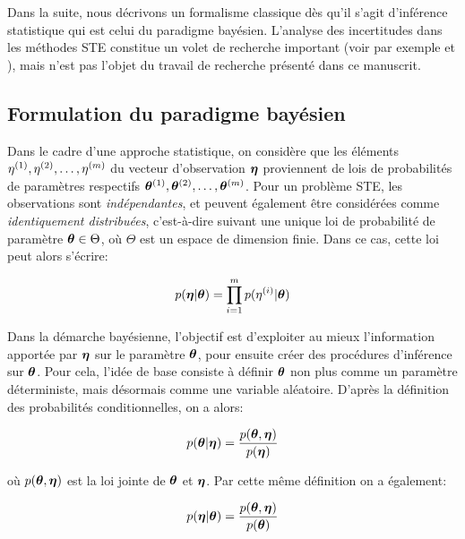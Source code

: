 	Dans la suite, nous décrivons un formalisme classique dès qu'il s'agit d'inférence statistique qui est celui du paradigme bayésien. L'analyse des incertitudes dans les méthodes STE constitue un volet de recherche important (voir par exemple \cite{Rodriguez2011} et \cite{Rodriguez2013}), mais n'est pas l'objet du travail de recherche présenté dans ce manuscrit.\\
	
	\subsection{Formulation du paradigme bayésien}
	\label{paragraphe_paradigme_bayesien}
	
	Dans le cadre d'une approche statistique, on considère que les éléments ${\eta}^{(1)}, {\eta}^{(2)}, \dots, {\eta}^{(m)}$ du vecteur d'observation ${\bm{\eta}}$ proviennent de lois de probabilités de paramètres respectifs ${\bm{\theta}}^{(1)}, {\bm{\theta}}^{(2)}, \dots, {\bm{\theta}}^{(m)}$. Pour un problème STE, les observations sont \textit{indépendantes}, et peuvent également être considérées comme \textit{identiquement distribuées}, c'est-à-dire suivant une unique loi de probabilité de paramètre ${\bm{\theta}} \in \Theta$, où $\Theta$ est un espace de dimension finie. Dans ce cas, cette loi peut alors s'écrire:
	
	\begin{equation}
		p({\bm{\eta}} | {\bm{\theta}}) = \prod_{i=1}^m p({\eta}^{(i)} | {\bm{\theta}})
		\label{eq_bayesien_modele_observation}
	\end{equation}
	
	Dans la démarche bayésienne, l'objectif est d'exploiter au mieux l'information apportée par ${\bm{\eta}}$ sur le paramètre ${\bm{\theta}}$, pour ensuite créer des procédures d'inférence sur ${\bm{\theta}}$. Pour cela, l'idée de base consiste à définir ${\bm{\theta}}$ non plus comme un paramètre déterministe, mais désormais comme une variable aléatoire. D'après la définition des probabilités conditionnelles, on a alors:
	
	\begin{equation}
		p({\bm{\theta}} | {\bm{\eta}}) = \dfrac{p({\bm{\theta}}, {\bm{\eta}})}{p({\bm{\eta}})}
		\label{equation_pre_bayes_1}
	\end{equation}
	
	où $p({\bm{\theta}}, {\bm{\eta}})$ est la loi jointe de ${\bm{\theta}}$ et ${\bm{\eta}}$. Par cette même définition on a également:
	
	\begin{equation}
		p({\bm{\eta}} | {\bm{\theta}}) =  \dfrac{p({\bm{\theta}}, {\bm{\eta}})}{p({\bm{\theta}})}
		\label{equation_pre_bayes_2}
	\end{equation}
	
